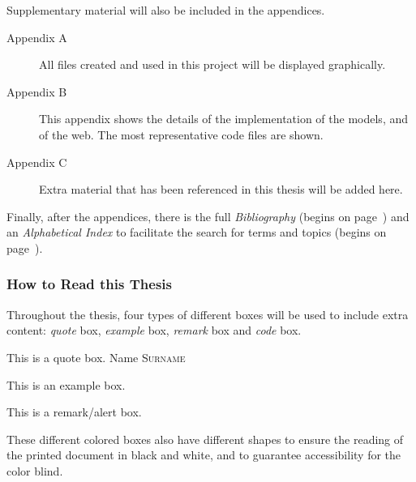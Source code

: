 Supplementary material will also be included in the appendices.

\begin{description}
  \item[Appendix A] All files created and used in this project will be
  displayed graphically. 
  \item[Appendix B] This appendix shows the details of the implementation of
  the models, and of the web. The most representative code files are
  shown. 
  \item[Appendix C] Extra material that has been referenced in this thesis will
  be added here. 
\end{description}

Finally, after the appendices, there is the full \textsl{Bibliography} (begins
on page~\pageref{cha:references}) and an \textsl{Alphabetical Index} to
facilitate the search for terms and topics (begins on
page~\pageref{cha:index}).

\subsubsection{How to Read this Thesis}

Throughout the thesis, four types of different boxes will be used to include
extra content: \emph{quote} box, \emph{example} box, \emph{remark} box and
\emph{code} box.

\begin{quoteBox}
  This is a quote box.
  \tcblower{}Name \textsc{Surname}
\end{quoteBox}

\begin{exampleBox}
  This is an example box.
\end{exampleBox}

\begin{remarkBox}
  This is a remark/alert box.
\end{remarkBox}


These different colored boxes also have different shapes to ensure the reading
of the printed document in black and white, and to guarantee accessibility for
the color blind.
